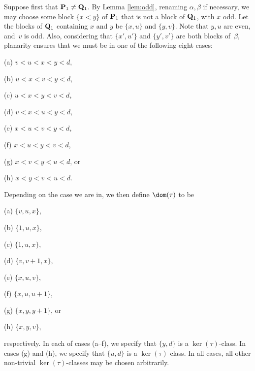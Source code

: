 \bigskip{}  Suppose first that ${\bf P}_1\not={\bf Q}_1$.  By Lemma \ref{lem:odd}, renaming $\alpha,\beta$ if necessary, we may choose some block $\{x<y\}$ of ${\bf P}_1$ that is not a block of ${\bf Q}_1$, with $x$ odd.  Let the blocks of ${\bf Q}_1$ containing $x$ and $y$ be $\{x,u\}$ and $\{y,v\}$.  Note that $y,u$ are even, and~$v$ is odd.  
%
Also, considering that $\{x',u'\}$ and $\{y',v'\}$ are both blocks of~$\beta$, planarity ensures that we must be in one of the following eight cases:
\begin{itemize}
\begin{multicols}{4}
\item[(a)] $v<u<x<y<d$,
\item[(b)] $u<x<v<y<d$,
\item[(c)] $u<x<y<v<d$,
\item[(d)] $v<x<u<y<d$,
\item[(e)] $x<u<v<y<d$,
\item[(f)] $x<u<y<v<d$, 
\item[(g)] $x<v<y<u<d$, or
\item[(h)] $x<y<v<u<d$.
\end{multicols}
\end{itemize}
Depending on the case we are in, we then define $\dom(\tau)$ to be
\begin{itemize}
\begin{multicols}{4}
\item[(a)] $\{v,u,x\}$,
\item[(b)] $\{1,u,x\}$,
\item[(c)] $\{1,u,x\}$,
\item[(d)] $\{v,v+1,x\}$, 
\item[(e)] $\{x,u,v\}$,
\item[(f)] $\{x,u,u+1\}$, 
\item[(g)] $\{x,y,y+1\}$, or
\item[(h)] $\{x,y,v\}$,
\end{multicols}
\end{itemize}
respectively.
%
In each of cases (a--f), we specify that $\{y,d\}$ is a $\ker(\tau)$-class.  In cases (g) and (h), we specify that $\{u,d\}$ is a $\ker(\tau)$-class.  In all cases, all other non-trivial $\ker(\tau)$-classes may be chosen arbitrarily.  
%
